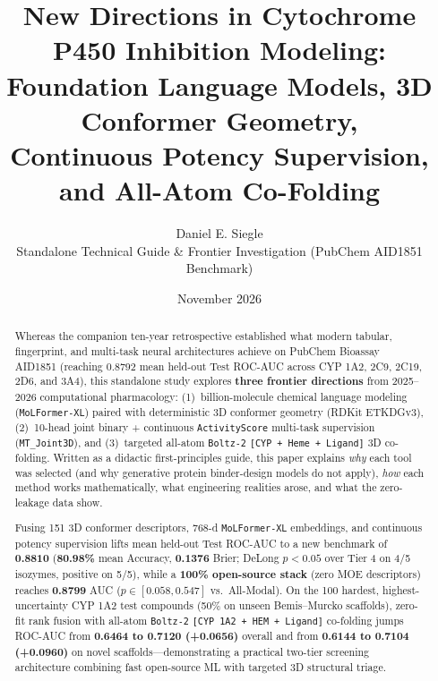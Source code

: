 \documentclass[11pt]{article}
\title{\textbf{New Directions in Cytochrome P450 Inhibition Modeling:\\
Foundation Language Models, 3D Conformer Geometry,\\
Continuous Potency Supervision, and All-Atom Co-Folding}}
\author{Daniel E. Siegle\\
\footnotesize Standalone Technical Guide \& Frontier Investigation (PubChem AID1851 Benchmark)}
\date{November 2026}
\begin{document}
\maketitle

\begin{abstract}
Whereas the companion ten-year retrospective established what modern tabular, fingerprint, and multi-task neural architectures achieve on PubChem Bioassay AID1851 (reaching 0.8792 mean held-out Test ROC-AUC across CYP 1A2, 2C9, 2C19, 2D6, and 3A4), this standalone study explores \textbf{three frontier directions} from 2025--2026 computational pharmacology: (1)~billion-molecule chemical language modeling (\texttt{MoLFormer-XL}) paired with deterministic 3D conformer geometry (RDKit ETKDGv3), (2)~10-head joint binary + continuous \texttt{ActivityScore} multi-task supervision (\texttt{MT\_Joint3D}), and (3)~targeted all-atom \texttt{Boltz-2} \texttt{[CYP + Heme + Ligand]} 3D co-folding. Written as a didactic first-principles guide, this paper explains \emph{why} each tool was selected (and why generative protein binder-design models do not apply), \emph{how} each method works mathematically, what engineering realities arose, and what the zero-leakage data show.

Fusing 151 3D conformer descriptors, 768-d \texttt{MoLFormer-XL} embeddings, and continuous potency supervision lifts mean held-out Test ROC-AUC to a new benchmark of \textbf{0.8810} (\textbf{80.98\%} mean Accuracy, \textbf{0.1376} Brier; DeLong $p < 0.05$ over Tier 4 on 4/5 isozymes, positive on 5/5), while a \textbf{100\% open-source stack} (zero MOE descriptors) reaches \textbf{0.8799} AUC ($p \in [0.058, 0.547]$ vs.\ All-Modal). On the 100 hardest, highest-uncertainty CYP 1A2 test compounds (50\% on unseen Bemis--Murcko scaffolds), zero-fit rank fusion with all-atom \texttt{Boltz-2} \texttt{[CYP 1A2 + HEM + Ligand]} co-folding jumps ROC-AUC from \textbf{0.6464 to 0.7120 (+0.0656)} overall and from \textbf{0.6144 to 0.7104 (+0.0960)} on novel scaffolds---demonstrating a practical two-tier screening architecture combining fast open-source ML with targeted 3D structural triage.
\end{abstract}
\end{document}
